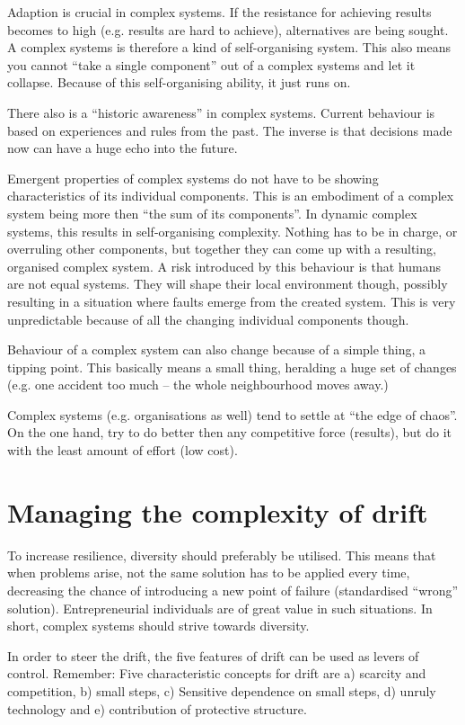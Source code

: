 Adaption is crucial in complex systems. 
If the resistance for achieving results becomes to high (e.g. results are hard to achieve), alternatives are being sought. 
A complex systems is therefore a kind of self-organising system.
This also means you cannot ``take a single component'' out of a complex systems and let it collapse. 
Because of this self-organising ability, it just runs on.

There also is a ``historic awareness'' in complex systems. 
Current behaviour is based on experiences and rules from the past. 
The inverse is that decisions made now can have a huge echo into the future.

Emergent properties of complex systems do not have to be showing characteristics of its individual components.
This is an embodiment of a complex system being more then ``the sum of its components''.
In dynamic complex systems, this results in self-organising complexity. 
Nothing has to be in charge, or overruling other components, but together they can come up with a resulting, organised complex system.
A risk introduced by this behaviour is that humans are not equal systems. 
They will shape their local environment though, possibly resulting in a situation where faults emerge from the created system. 
This is very unpredictable because of all the changing individual components though.

Behaviour of a complex system can also change because of a simple thing, a tipping point.
This basically means a small thing, heralding a huge set of changes (e.g. one accident too much -- the whole neighbourhood moves away.)

Complex systems (e.g. organisations as well) tend to settle at ``the edge of chaos''. 
On the one hand, try to do better then any competitive force (results), but do it with the least amount of effort (low cost). 

\chapter{Managing the complexity of drift}
To increase resilience, diversity should preferably be utilised.
This means that when problems arise, not the same solution has to be applied every time, decreasing the chance of introducing a new point of failure (standardised ``wrong'' solution).
Entrepreneurial individuals are of great value in such situations.
In short, complex systems should strive towards diversity.

In order to steer the drift, the five features of drift can be used as levers of control.
Remember: Five characteristic concepts for drift are a) scarcity and competition, b) small steps, c) Sensitive dependence on small steps, d) unruly technology and e) contribution of protective structure.

